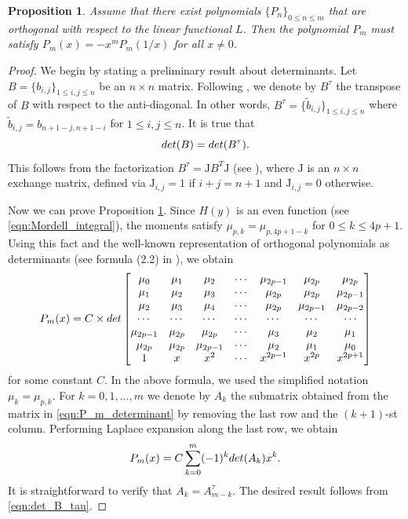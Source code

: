 \documentclass[10pt,a4paper]{amsart}
\newtheorem{proposition}{Proposition}
\begin{document}
\begin{proposition}\label{prop:P_m} Assume that there exist polynomials $\{P_n\}_{0\le n \le m}$ that are orthogonal with respect to the linear functional $L$. Then 
the polynomial $P_m$  must satisfy
$P_m(x)=-x^m P_m(1/x)$ for all $x\neq 0$.
\end{proposition} 

\begin{proof} We begin by stating a preliminary result about determinants. Let $B=\{b_{i,j}\}_{1 \le i,j \le n}$ be an $n\times n$ matrix. Following \cite{Golyshev2007}, we denote by $B^{\tau}$ the transpose of  $B$  with respect to the anti-diagonal. In other words, $B^{\tau}=\{\tilde b_{i,j}\}_{1 \le i,j \le n}$ where $\tilde b_{i,j}=b_{n+1-j,n+1-i}$ for $1\le i,j \le n$. 
It is true that
\begin{equation}\label{eqn:det_B_tau}
{\textnormal{det}}(B) = {\textnormal{det}}(B^{\tau}).
\end{equation} 
This follows from the factorization $B^{\tau}={\textrm{J}} B^T {\textrm{J}}$ (see \cite{Golyshev2007}), where ${\textrm{J}}$ is an $n\times n$ exchange matrix, defined via ${\textrm{J}}_{i,j}=1$ if $i+j=n+1$ and ${\textrm{J}}_{i,j}=0$ otherwise. 

Now we can prove Proposition \ref{prop:P_m}. Since $H(y)$ is an even function (see \eqref{eqn:Mordell_integral}),   the moments  satisfy $\mu_{p,k}=\mu_{p,4p+1-k}$ for $0\le k \le 4p+1$. Using this fact and the well-known representation of orthogonal polynomials as determinants (see formula (2.2) in \cite{MARCELLAN2001}), we obtain
\begin{equation}\label{eqn:P_m_determinant}
P_m(x)= C \times  {\textnormal{det}}\begin{bmatrix}
\mu_0 & \mu_1 & \mu_2 & \cdots & \mu_{2p-1} &  \mu_{2p} & \mu_{2p} \\
\mu_1 & \mu_2 & \mu_3 & \cdots & \mu_{2p} & \mu_{2p} & \mu_{2p-1} \\
\mu_2 & \mu_3 & \mu_4 & \cdots & \mu_{2p} & \mu_{2p-1} & \mu_{2p-2} \\
\cdots  & \cdots  & \cdots  &   \cdots & \cdots & \cdots  & \cdots  \\
\mu_{2p-1} & \mu_{2p} & \mu_{2p}  & \cdots &\mu_{3} &\mu_{2} & \mu_{1} \\
\mu_{2p} & \mu_{2p} & \mu_{2p-1}  & \cdots &\mu_{2} &\mu_{1} & \mu_{0} \\
1 & x & x^2 & \cdots & x^{2p-1} & x^{2p} & x^{2p+1} 
\end{bmatrix}
\end{equation}
for some constant $C$. In the above formula, we used the simplified notation $\mu_k=\mu_{p,k}$. 
For $k=0,1,\dots,m$ we denote by $A_k$ the submatrix obtained from the matrix in \eqref{eqn:P_m_determinant} by removing the last row and the $(k+1)$-st column.  Performing Laplace expansion along the last row, we obtain
$$
P_m(x)=C \sum\limits_{k=0}^{m} (-1)^k {\textnormal{det}}(A_k) x^k. 
$$
It is straightforward  to verify that $A_k=A_{m-k}^{\tau}$. The desired result follows from \eqref{eqn:det_B_tau}.   
\end{proof}
\end{document}
